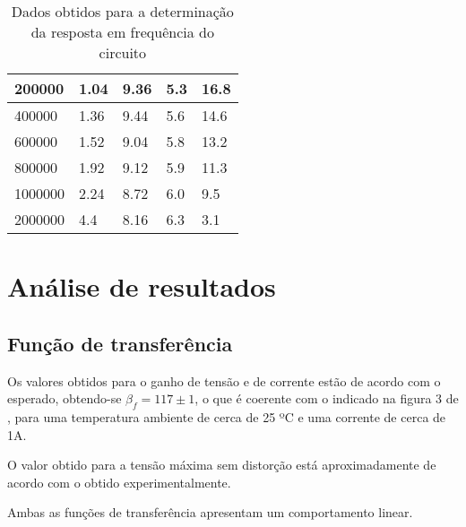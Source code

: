 \documentclass[%
  reprint,
  nofootinbib,
  amsmath,amssymb,
  aps,
  10pt,
  a4paper
]{revtex4-1}
\begin{document}
\begin{table}[h]
\begin{tabular}{|l|l|l|l|l|}
    200000                           	    & 1.04  & 9.36&  5.3	&16.8			\\ \hline
    400000                           	    & 1.36  & 9.44&  5.6	&14.6				\\ \hline
    600000                           	    & 1.52  & 9.04&  5.8	&13.2				\\ \hline
    800000                           	    & 1.92  & 9.12&  5.9	&11.3				\\ \hline
    1000000                          	    & 2.24  & 8.72&  6.0	&9.5				\\ \hline
    2000000				    &4.4     &8.16 &  6.3     &3.1                          \\ \hline
    \end{tabular}
\caption{Dados obtidos para a determinação da resposta em frequência do circuito}
\label{tab:respostafrequencia}
\end{table}






\section{Análise de resultados}
\label{s:aresul}

\subsection{Função de transferência}

Os valores obtidos para o ganho de tensão e de corrente estão de acordo com o esperado, obtendo-se $\beta_f = 117\pm1$, o que é coerente com o indicado na figura 3 de \cite{data}, para uma temperatura ambiente de cerca de 25 ºC e uma corrente de cerca de 1A.

O valor obtido para a tensão máxima sem distorção está aproximadamente de acordo com o obtido experimentalmente.

Ambas as funções de transferência apresentam um comportamento linear.
\end{document}
